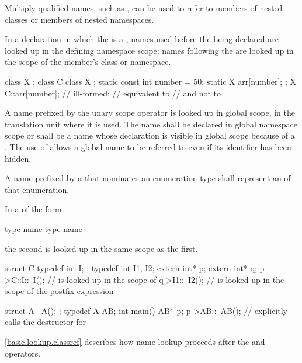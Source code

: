 \pnum
\begin{note} Multiply qualified names, such as , can
be used to refer to members of nested classes or
members of nested namespaces. \end{note}

\pnum
In a declaration in which the  is a
, names used before the 
being declared are looked up in the defining namespace scope; names
following the  are looked up in the scope of the
member's class or namespace. \begin{example}

\begin{codeblock}
class X { };
class C {
  class X { };
  static const int number = 50;
  static X arr[number];
};
X C::arr[number];   // ill-formed:
                    // equivalent to  
                    // and not to  
\end{codeblock}
\end{example}

\pnum
{}%
%
A name prefixed by the unary scope operator \tcode{::}
is looked up in global scope, in the translation unit where it is used.
The name shall be declared in global namespace scope or shall be a name
whose declaration is visible in global scope because of a
. The use of \tcode{::}
allows a global name to be referred to even if its identifier has been
hidden.

\pnum
A name prefixed by a  that
nominates an enumeration type shall represent an 
of that enumeration.

\pnum
In a  of the form:

\begin{ncbnf}
 type-name \terminal{::} \terminal{\~} type-name
\end{ncbnf}
the second  is looked up in the same scope as the first.
\begin{example}
\begin{codeblock}
struct C {
  typedef int I;
};
typedef int I1, I2;
extern int* p;
extern int* q;
p->C::I::~I();      //  is looked up in the scope of 
q->I1::~I2();       //  is looked up in the scope of the postfix-expression

struct A {
  ~A();
};
typedef A AB;
int main() {
  AB* p;
  p->AB::~AB();     // explicitly calls the destructor for 
}
\end{codeblock}
\end{example}
\begin{note} \ref{basic.lookup.classref} describes how name
lookup proceeds after the  and \tcode{->} operators.
\end{note}

